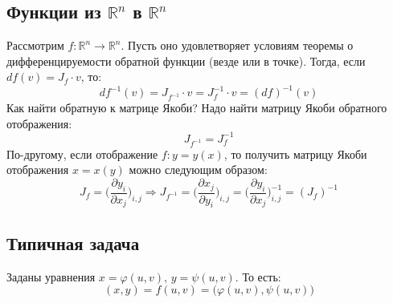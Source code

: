 \documentclass[12pt]{article}
\newcommand{\MR}{\mathbb{R}}
\theoremstyle{definition}
\begin{document}
\subsection*{Функции из $\MR^n$ в $\MR^n$}

Рассмотрим $f \colon \MR^n \to \MR^n$. Пусть оно удовлетворяет условиям теоремы о дифференцируемости обратной функции (везде или в точке). Тогда, если $df(v) = J_f{\cdot}v$, то:
$$
	df^{-1}(v) = J_{f^{-1}}{\cdot}v =  J_f^{-1}{\cdot}v = (df)^{-1}(v)
$$	
Как найти обратную к матрице Якоби? Надо найти матрицу Якоби обратного отображения:
$$
	J_{f^{-1}} = J_f^{-1}
$$
По-другому, если отображение $f\colon y = y(x)$, то получить матрицу Якоби отображения $x = x(y)$ можно следующим образом:
$$
	J_f = \bigg(\dfrac{\partial y_i}{\partial x_j}\bigg)_{i,j} \Rightarrow  J_{f^{-1}} = \bigg(\dfrac{\partial x_j}{\partial y_i}\bigg)_{i,j} =  \bigg(\dfrac{\partial y_i}{\partial x_j}\bigg)^{-1}_{i,j} = (J_f)^{-1}
$$

\subsection*{Типичная задача} 
Заданы уравнения $x = \varphi(u,v), \, y = \psi(u,v)$. То есть:
$$
	(x,y) = f(u,v) = \big(\varphi(u,v), \psi(u,v)\big)
$$
\end{document}
